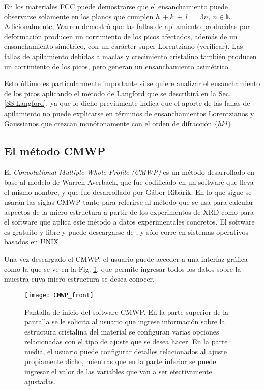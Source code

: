 En los materiales FCC puede demostrarse que el ensanchamiento puede observarse solamente en los planos que cumplen $h \ + k \ + \ l \ = \ 3n, \ n \in \mathbb N$.
Adicionalmente, Warren demostró que las fallas de apilamiento producidas por deformación producen un corrimiento de los picos afectados, además de un ensanchamiento simétrico, con un carácter super-Lorentziano (verificar).
Las fallas de apilamiento debidas a maclas y crecimiento cristalino también producen un corrimiento de los picos, pero generan un ensanchamiento asimétrico.

Esto último es particularmente importante si se quiere analizar el ensanchamiento de los picos aplicando el método de Langford que se describirá en la Sec. \ref{SS:Langford}, ya que lo dicho previamente indica que el aporte de las fallas de apilamiento no puede explicarse en términos de ensanchamientos Lorentzianos y Gaussianos que crezcan monótonamente con el orden de difracción $\{hkl\}$.

\subsection{El método CMWP}\label{SS:CMWP}
El \textit{Convolutional Multiple Whole Profile (CMWP)} es un método desarrollado en base al modelo de Warren-Averbach, que fue codificado en un software que lleva el mismo nombre, y que fue desarrollado por Gábor Ribárik\cite{Ungar2001,Ribarik2001,Ribarik2008}. 
En lo que sigue se usarán las siglas CMWP tanto para referirse al método que se usa para calcular aspectos de la micro-estructura a partir de los experimentos de XRD como para el software que aplica este método a datos experimentales concretos.
El software es gratuito y libre y puede descargarse de \cite{cmwp:web}, y sólo corre en sistemas operativos basados en UNIX.

Una vez descargado el CMWP, el usuario puede acceder a una interfaz gráfica como la que se ve en la Fig. \ref{fig:CMWP_front}, que permite ingresar todos los datos sobre la muestra cuya micro-estructura se desea conocer.
\begin{figure}[!htb]
  \centering
  \texttt{[image: CMWP\_front]}
  \caption{Pantalla de inicio del software CMWP. En la parte superior de la pantalla se le solicita al usuario que ingrese información sobre la estructura cristalina del material se configuran varias opciones relacionadas con el tipo de ajuste que se desea hacer. En la parte media, el usuario puede configurar detalles relacionados al ajuste propiamente dicho, mientras que en la parte inferior se puede ingresar el valor de las variables que van a ser efectivamente ajustadas.}
  \label{fig:CMWP_front}
\end{figure}

